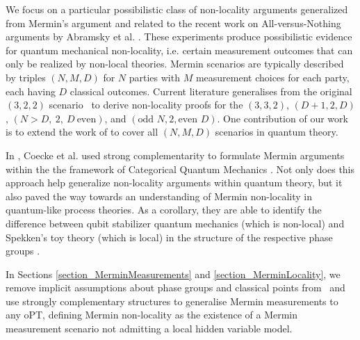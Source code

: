         We focus on a particular possibilistic class of non-locality arguments generalized from Mermin's argument \cite{mermin1990quantum} and related to the recent work on All-versus-Nothing arguments by Abramsky et al. \cite{NLC-AvN}. These experiments produce possibilistic evidence for quantum mechanical non-locality, i.e. certain measurement outcomes that can only be realized by non-local theories.  Mermin scenarios are typically described by triples $(N,M,D)$ for $N$ parties with $M$ measurement choices for each party, each having $D$ classical outcomes. Current literature generalises from the original $(3,2,2)$ scenario~\cite{mermin1990quantum} to derive non-locality proofs for the $(3,3,2)$\cite{ryu2014multisetting}, $(D+1,2,D)$\cite{zukowski-GHZ-multiport}, $(N>D,~2,~D~\mbox{even})$\cite{cerf-GHZ-many}, and $(\mbox{odd }N, 2, \mbox{even }D)$\cite{lee-even-dim}. One contribution of our work is to extend the work of \cite{coecke2012strong} to cover all $(N,M,D)$ scenarios in quantum theory.

In \cite{coecke2012strong}, Coecke et al. used strong complementarity to formulate Mermin arguments within the the framework of Categorical Quantum Mechanics \cite{abramsky2008categorical}. Not only does this approach help generalize non-locality arguments within quantum theory, but it also paved the way towards an understanding of Mermin non-locality in quantum-like process theories. As a corollary, they are able to identify the difference between qubit stabilizer quantum mechanics (which is non-local) and Spekken's toy theory (which is local) in the structure of the respective phase groups \cite{coecke2012strong,coecke2011phase}.

In Sections \ref{section_MerminMeasurements} and \ref{section_MerminLocality}, we remove implicit assumptions about phase groups and classical points from~\cite{coecke2012strong} and use strongly complementary structures to generalise Mermin measurements to any oPT, defining Mermin non-locality as the existence of a Mermin measurement scenario not admitting a local hidden variable model.

